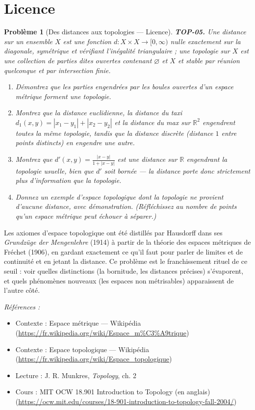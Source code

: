 \documentclass[11pt]{article}
\newtheorem{problem}{Problème}
\newenvironment{refs}{\par\small\noindent\emph{Références :}\begin{itemize}\setlength\itemsep{0pt}}{\end{itemize}\normalsize}
\begin{document}
\bigskip


\section*{Licence}

\begin{problem}[{Des distances aux topologies --- Licence}]
\textbf{TOP-05.} Une distance sur un ensemble $ X $ est une fonction
$ d : X \times X \to [0,\infty) $ nulle exactement sur la diagonale, symétrique et vérifiant
l'inégalité triangulaire ; une topologie sur $ X $ est une collection de parties dites \og{} ouvertes \fg{}
contenant $ \varnothing $ et $ X $ et stable par réunion quelconque et par intersection
finie.
\begin{enumerate}
\item[(a)] Démontrez que les parties engendrées par les boules ouvertes d'un espace métrique forment une
topologie.
\item[(b)] Montrez que la distance euclidienne, la distance du taxi
$ d_1(x,y) = |x_1 - y_1| + |x_2 - y_2| $ et la distance du max sur $ \mathbb{R}^2 $ engendrent
toutes la même topologie, tandis que la distance discrète (distance $ 1 $ entre points distincts) en
engendre une autre.
\item[(c)] Montrez que $ d'(x,y) = \frac{|x-y|}{1+|x-y|} $ est une distance sur $\mathbb{R}$ engendrant la topologie
usuelle, bien que $ d' $ soit bornée --- la distance porte donc strictement plus d'information que la
topologie.
\item[(d)] Donnez un exemple d'espace topologique dont la topologie ne provient d'aucune distance, avec
démonstration. (Réfléchissez au nombre de points qu'un espace métrique peut échouer à séparer.)
\end{enumerate}

\end{problem}

\noindent Les axiomes d'espace topologique ont été distillés par Hausdorff dans ses
\textit{Grundzüge der Mengenlehre} (1914) à partir de la théorie des espaces métriques de Fréchet (1906),
en gardant exactement ce qu'il faut pour parler de limites et de continuité et en jetant la distance. Ce
problème est le franchissement rituel de ce seuil : voir quelles distinctions (la bornitude, les
distances précises) s'évaporent, et quels phénomènes nouveaux (les espaces non métrisables) apparaissent
de l'autre côté.

\begin{refs}
\item Contexte : Espace métrique --- Wikipédia (\url{https://fr.wikipedia.org/wiki/Espace_m%C3%A9trique})
\item Contexte : Espace topologique --- Wikipédia (\url{https://fr.wikipedia.org/wiki/Espace_topologique})
\item Lecture : J. R. Munkres, \textit{Topology}, ch. 2
\item Cours : MIT OCW 18.901 Introduction to Topology (en anglais) (\url{https://ocw.mit.edu/courses/18-901-introduction-to-topology-fall-2004/})
\end{refs}
\end{document}
